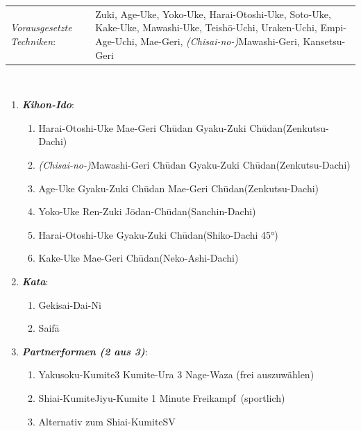 \documentclass[a5paper,landscape,DIV=calc,11pt,notitlepage]{scrartcl}
\newcommand{\bull}{\,\textbullet\,}
\begin{document}
\pagebreak
\begin{tcolorbox}[colback=white,colframe=BLBELT,coltitle=white,title=5. Kyu: Blau]
	\renewcommand{\labelenumi}{\alph{enumi}.)}
	\renewcommand{\labelenumii}{\arabic*.}
	{\scriptsize
		\begin{tabularx}{\textwidth}{lX}
			\textit{Vorausgesetzte Techniken}:& Zuki, Age-Uke, Yoko-Uke, Harai-Otoshi-Uke, Soto-Uke, Kake-Uke, Mawashi-Uke, Teish\={o}-Uchi, Uraken-Uchi, \mbox{Empi-Age-Uchi}, Mae-Geri, \textit{(Chisai-no-)}Mawashi-Geri, Kansetsu-Geri
		\end{tabularx}\\}\vspace{12pt}
	\begin{enumerate}[nosep]
		\item \textit{\textbf{Kihon-Ido}}:
		\begin{enumerate}[nosep]
			\item Harai-Otoshi-Uke\bull Mae-Geri Ch\={u}dan\bull Gyaku-Zuki Ch\={u}dan\tabto{280pt}(Zenkutsu-Dachi)
			\item \textit{(Chisai-no-)}Mawashi-Geri Ch\={u}dan\bull Gyaku-Zuki Ch\={u}dan\tabto{280pt}(Zenkutsu-Dachi)
			\item Age-Uke\bull Gyaku-Zuki Ch\={u}dan\bull Mae-Geri Ch\={u}dan\tabto{280pt}(Zenkutsu-Dachi)
			\item Yoko-Uke\bull Ren-Zuki J\={o}dan-Ch\={u}dan\tabto{280pt}(Sanchin-Dachi)
			\item Harai-Otoshi-Uke\bull Gyaku-Zuki Ch\={u}dan\tabto{280pt}(Shiko-Dachi 45°)
			\item Kake-Uke\bull Mae-Geri Ch\={u}dan\tabto{280pt}(Neko-Ashi-Dachi)
		\end{enumerate}\vspace{24pt}
		\item \textit{\textbf{Kata}}:
		\begin{enumerate}[nosep]
			\item Gekisai-Dai-Ni
			\item Saif\={a}
		\end{enumerate}\vspace{24pt}
		\item \textit{\textbf{Partnerformen (2 aus 3)}}:
		\begin{enumerate}[nosep]
			\item Yakusoku-Kumite\tabto{200pt}3 Kumite-Ura\bull 3 Nage-Waza (frei auszuwählen)
			\item Shiai-Kumite\tabto{200pt}Jiyu-Kumite 1 Minute \frqq Freikampf\flqq~(sportlich)
			\item Alternativ zum Shiai-Kumite\tabto{200pt}SV
		\end{enumerate}
	\end{enumerate}
\end{tcolorbox}
\end{document}
